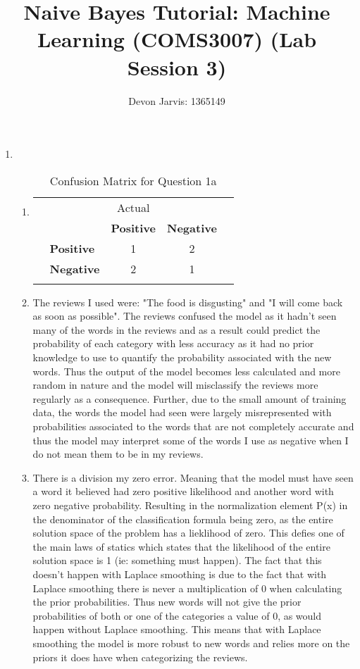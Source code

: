 \documentclass{article}
\title{Naive Bayes Tutorial: Machine Learning (COMS3007) (Lab Session 3)}
\author{Devon Jarvis: 1365149}
\begin{document}
	\maketitle
	\begin{enumerate}
		\item 
		\begin{enumerate}
			\item
			\begin{table}[h!]
				\begin{center}
					\caption{Confusion Matrix for Question 1a}
					\label{tab:table1}
					\begin{tabular}{l|l|c|c|c}
						 \multicolumn{5}{c}{Actual} \\
						 \multirow{3}{*}{\rotatebox[origin=c]{90}{ Predicted}} & &\textbf{Positive} & \textbf{Negative} &\\
						&\textbf{Positive} &       1			  &        2		  & \\
						&\textbf{Negative} &       2			  &        1		  &\\ \\ 				
					\end{tabular}
				\end{center}
			\end{table}
			\item
			The reviews I used were: "The food is disgusting" and "I will come back as soon as possible". The reviews confused the model as it hadn't seen many of the words in the reviews and as a result could predict the probability of each category with less accuracy as it had no prior knowledge to use to quantify the probability associated with the new words. Thus the output of the model becomes less calculated and more random in nature and the model will misclassify the reviews more regularly as a consequence. Further, due to the small amount of training data, the words the model had seen were largely misrepresented with probabilities associated to the words that are not completely accurate and thus the model may interpret some of the words I use as negative when I do not mean them to be in my reviews.
			
			\item There is a division my zero error. Meaning that the model must have seen a word it believed had zero positive likelihood and another word with zero negative probability. Resulting in the normalization element P(x) in the denominator of the classification formula being zero, as the entire solution space of the problem has a lieklihood of zero. This defies one of the main laws of statics which states that the likelihood of the entire solution space is 1 (ie: something must happen). The fact that this doesn't happen with Laplace smoothing is due to the fact that with Laplace smoothing there is never a multiplication of 0 when calculating the prior probabilities. Thus new words will not give the prior probabilities of both or one of the categories a value of 0, as would happen without Laplace smoothing. This means that with Laplace smoothing the model is more robust to new words and relies more on the priors it does have when categorizing the reviews.
			

\end{enumerate}
\end{enumerate}
\end{document}
